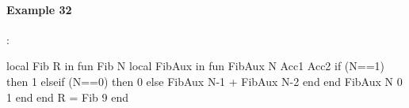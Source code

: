 \documentclass[11pt,a4paper,twoside,openright]{report}
\begin{document}
%
%
%

\paragraph{Example 32}:

\begin{OZ}
local Fib R in
    fun {Fib N}
        local FibAux in
            fun {FibAux N Acc1 Acc2}
			   if (N==1) then 1
			   elseif (N==0) then 0
			   else {FibAux N-1 } + {FibAux N-2 } end
		end
        	 {FibAux N 0 1}
		end
    	end
	R = {Fib 9}
end
\end{OZ}
\end{document}
